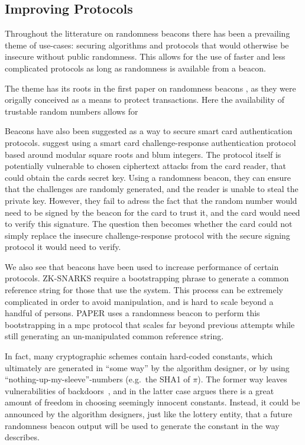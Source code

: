 \subsection{Improving Protocols}
Throughout the litterature on randomness beacons there has been a prevailing theme of use-cases: securing algorithms and protocols that would otherwise be insecure without public randomness. This allows for the use of faster and less complicated protocols as long as randomness is available from a beacon. 

The theme has its roots in the first paper on randomness beacons \cite{rabin1983transaction}, as they were origally conceived as a means to protect transactions. Here the availability of trustable random numbers allows for 

Beacons have also been suggested as a way to secure smart card authentication protocols. \citet{fischer2011publicrandomnessservice} suggest using a smart card challenge-response authentication protocol based around modular square roots and blum integers. The protocol itself is potentially vulnerable to chosen ciphertext attacks from the card reader, that could obtain the cards secret key. Using a randomness beacon, they can ensure that the challenges are randomly generated, and the reader is unable to steal the private key. However, they fail to adress the fact that the random number would need to be signed by the beacon for the card to trust it, and the card would need to verify this signature. The question then becomes whether the card could not simply replace the insecure challenge-response protocol with the secure signing protocol it would need to verify.

We also see that beacons have been used to increase performance of certain protocols. ZK-SNARKS require a bootstrapping phrase to generate a common reference string for those that use the system. This process can be extremely complicated in order to avoid manipulation, and is hard to scale beyond a handful of persons. PAPER uses a randomness beacon to perform this bootstrapping in a mpc protocol that scales far beyond previous attempts while still generating an un-manipulated common reference string. 

In fact, many cryptographic schemes contain hard-coded constants, which ultimately are generated in \enquote{some way} by the algorithm designer, or by using \enquote{nothing-up-my-sleeve}-numbers (e.g.\ the SHA1 of $\pi$).
The former way leaves vulnerabilities of backdoors~, and in the latter case  argues there is a great amount of freedom in choosing seemingly innocent constants.
Instead, it could be announced by the algorithm designers, just like the lottery entity, that a future randomness beacon output will be used to generate the constant in the way  describes.
